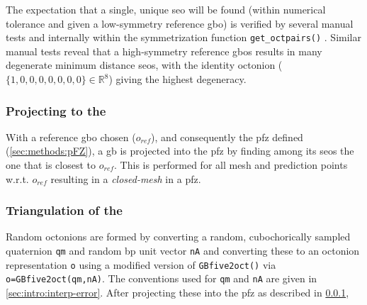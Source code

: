 \documentclass[preprint,12pt]{elsarticle}
\begin{document}
The expectation that a single, unique \gls{seo} will be found (within numerical tolerance and given a low-symmetry reference \gls{gbo}) is verified by several manual tests and internally within the symmetrization function \texttt{get\_octpairs()} \cite{bairdFiveDegreeofFreedom5DOF2020}. Similar manual tests reveal that a high-symmetry reference \glspl{gbo} results in many degenerate minimum distance \glspl{seo}, with the identity octonion ($\{1,0,0,0,0,0,0,0\}\in\mathbb{R}^8$) \cite{francisGeodesicOctonionMetric2019} giving the highest degeneracy.

\subsubsection{Projecting  to the }
\label{sec:methods:projecting}


With a reference \gls{gbo} chosen ($o_{ref}$), and consequently the \gls{pfz} defined (\cref{sec:methods:pFZ}), a \gls{gb} is projected into the \gls{pfz} by finding among its \glspl{seo} the one that is closest to $o_{ref}$. This is performed for all mesh and prediction points w.r.t. $o_{ref}$ resulting in a \textit{closed-mesh} in a \gls{pfz}.


\subsubsection{Triangulation of the }
\label{sec:methods:triangulation}


Random octonions are formed by converting a random, cubochorically sampled quaternion \cite{singhOrientationSamplingDictionarybased2016} \texttt{qm} and random \gls{bp} unit vector \texttt{nA} and converting these to an octonion representation \texttt{o} using a modified version \cite{bairdFiveDegreeofFreedom5DOF2020} of \texttt{GBfive2oct()} \cite{chesserGBOctonionCode2019} via \texttt{o=GBfive2oct(qm,nA)}. The conventions used for \texttt{qm} and \texttt{nA} are given in \cref{sec:intro:interp-error}. After projecting these into the \gls{pfz} as described in \cref{sec:methods:projecting}, %
\end{document}
